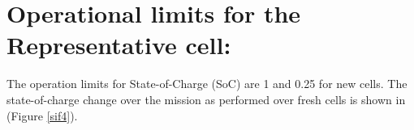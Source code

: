\documentclass{achemso}
\begin{document}
\clearpage
\section*{Operational limits for the Representative cell:}
\vspace{-0.5cm}
The operation limits for State-of-Charge (SoC) are 1 and 0.25 for new cells. The state-of-charge change over the mission as performed over fresh cells is shown in (Figure \ref{sif4}).

\vspace{-0.2cm}

\end{document}
